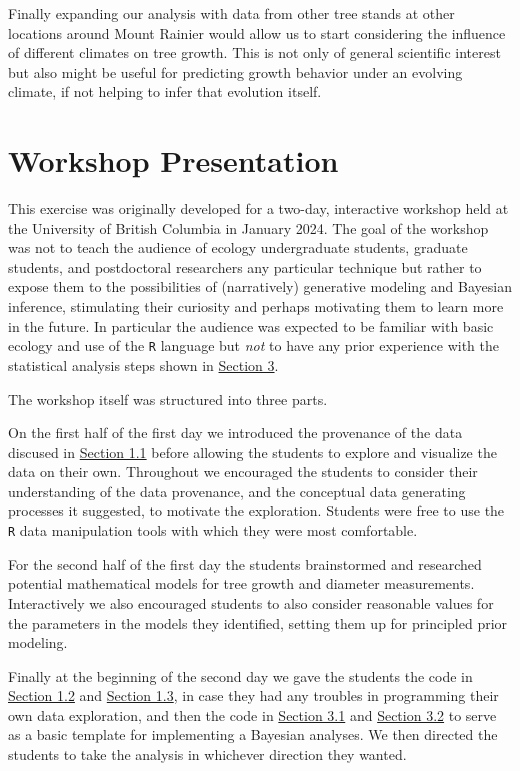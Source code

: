 \documentclass[
  letterpaper,
  DIV=11,
  numbers=noendperiod]{scrartcl}
\begin{document}
Finally expanding our analysis with data from other tree stands at other
locations around Mount Rainier would allow us to start considering the
influence of different climates on tree growth. This is not only of
general scientific interest but also might be useful for predicting
growth behavior under an evolving climate, if not helping to infer that
evolution itself.

\hypertarget{workshop-presentation}{%
\section{Workshop Presentation}\label{workshop-presentation}}

This exercise was originally developed for a two-day, interactive
workshop held at the University of British Columbia in January 2024. The
goal of the workshop was not to teach the audience of ecology
undergraduate students, graduate students, and postdoctoral researchers
any particular technique but rather to expose them to the possibilities
of (narratively) generative modeling and Bayesian inference, stimulating
their curiosity and perhaps motivating them to learn more in the future.
In particular the audience was expected to be familiar with basic
ecology and use of the \texttt{R} language but \emph{not} to have any
prior experience with the statistical analysis steps shown in
\protect\hyperlink{sec:analyses}{Section 3}.

The workshop itself was structured into three parts.

On the first half of the first day we introduced the provenance of the
data discused in \protect\hyperlink{sec:provenance}{Section 1.1} before
allowing the students to explore and visualize the data on their own.
Throughout we encouraged the students to consider their understanding of
the data provenance, and the conceptual data generating processes it
suggested, to motivate the exploration. Students were free to use the
\texttt{R} data manipulation tools with which they were most
comfortable.

For the second half of the first day the students brainstormed and
researched potential mathematical models for tree growth and diameter
measurements. Interactively we also encouraged students to also consider
reasonable values for the parameters in the models they identified,
setting them up for principled prior modeling.

Finally at the beginning of the second day we gave the students the code
in \protect\hyperlink{sec:initial-setup}{Section 1.2} and
\protect\hyperlink{sec:eda}{Section 1.3}, in case they had any troubles
in programming their own data exploration, and then the code in
\protect\hyperlink{sec:setup}{Section 3.1} and
\protect\hyperlink{sec:homo-linear}{Section 3.2} to serve as a basic
template for implementing a Bayesian analyses. We then directed the
students to take the analysis in whichever direction they wanted.
\end{document}
